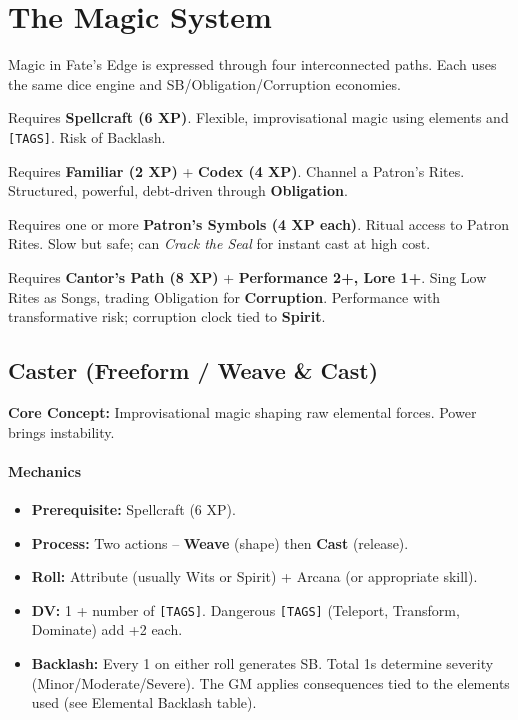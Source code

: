 \section{The Magic System}

Magic in Fate's Edge is expressed through four interconnected paths. Each uses the same dice engine and SB/Obligation/Corruption economies.

\begin{description}[leftmargin=1.5em, style=nextline]
  \item[Caster (Freeform):] Requires \textbf{Spellcraft (6 XP)}. Flexible, improvisational magic using elements and \texttt{[TAGS]}. Risk of Backlash.
  \item[Runekeeper (Rites):] Requires \textbf{Familiar (2 XP)} + \textbf{Codex (4 XP)}. Channel a Patron's Rites. Structured, powerful, debt-driven through \textbf{Obligation}.
  \item[Invoker (Symbols):] Requires one or more \textbf{Patron's Symbols (4 XP each)}. Ritual access to Patron Rites. Slow but safe; can \emph{Crack the Seal} for instant cast at high cost.
  \item[Cantor (Songs):] Requires \textbf{Cantor's Path (8 XP)} + \textbf{Performance 2+, Lore 1+}. Sing Low Rites as Songs, trading Obligation for \textbf{Corruption}. Performance with transformative risk; corruption clock tied to \textbf{Spirit}.
\end{description}

\subsection{Caster (Freeform / Weave \& Cast)}

\textbf{Core Concept:} Improvisational magic shaping raw elemental forces. Power brings instability.

\paragraph{Mechanics}
\begin{itemize}
  \item \textbf{Prerequisite:} Spellcraft (6 XP).
  \item \textbf{Process:} Two actions -- \textbf{Weave} (shape) then \textbf{Cast} (release). 
  \item \textbf{Roll:} Attribute (usually Wits or Spirit) + Arcana (or appropriate skill).
  \item \textbf{DV:} 1 + number of \texttt{[TAGS]}. Dangerous \texttt{[TAGS]} (Teleport, Transform, Dominate) add +2 each.
  \item \textbf{Backlash:} Every 1 on either roll generates SB. Total 1s determine severity (Minor/Moderate/Severe). The GM applies consequences tied to the elements used (see Elemental Backlash table).
\end{itemize}

